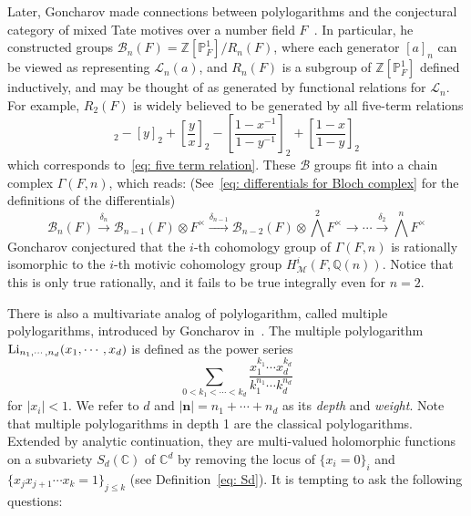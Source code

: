 Later, Goncharov made connections between polylogarithms and the conjectural category of mixed Tate motives over a number field $F$~\cite{GoncharovMotivicGalois}. In particular, he constructed groups $\mathcal B_n(F)=\mathbb Z[\mathbb P^1_F]/R_n(F)$, where each generator $[a]_n$ can be viewed as representing $\mathcal L_n(a)$, and $R_n(F)$ is a subgroup of $\mathbb Z[\mathbb P_F^1]$ defined inductively, and may be thought of as generated by functional relations for $\mathcal L_n$. For example, $R_2(F)$ is widely believed to be generated by all five-term relations
\begin{equation}
[x]_2-[y]_2+\left[\frac{y}{x}\right]_2-\left[\frac{1-x^{-1}}{1-y^{-1}}\right]_2+\left[\frac{1-x}{1-y}\right]_2
\end{equation}
which corresponds to~\eqref{eq: five term relation}. These $\mathcal B$ groups fit into a chain complex $\Gamma(F,n)$, which reads: (See~\eqref{eq: differentials for Bloch complex} for the definitions of the differentials)
\begin{equation}\label{eq: Bloch complex}
\mathcal B_n(F)\xrightarrow{\delta_n}\mathcal B_{n-1}(F)\otimes F^\times\xrightarrow{\delta_{n-1}}\mathcal B_{n-2}(F)\otimes \textstyle\bigwedge^2F^\times\to\cdots\xrightarrow{\delta_2}\textstyle\bigwedge^nF^\times
\end{equation}
Goncharov conjectured that the $i$-th cohomology group of $\Gamma(F,n)$ is rationally isomorphic to the $i$-th motivic cohomology group $H^i_{\mathcal M}(F,\mathbb Q(n))$. Notice that this is only true rationally, and it fails to be true integrally even for $n=2$.

There is also a multivariate analog of polylogarithm, called multiple polylogarithms, introduced by Goncharov in~\cite{Goncharov_GaloisSymmetriesOfFundamentalGroupoidsAndNoncommutativeGeometry}. The multiple polylogarithm $\operatorname{Li}_{n_1,\cdots,n_d}(x_1,\cdots,x_d)$ is defined as the power series
\[
\sum_{0<k_1<\cdots<k_d}\frac{x_1^{k_1}\cdots x_d^{k_d}}{k_1^{n_1}\cdots k_d^{n_d}}
\]
for $|x_i|<1$. We refer to $d$ and $|\mathbf n|=n_1+\cdots+n_d$ as its \textit{depth} and \textit{weight}. Note that multiple polylogarithms in depth 1 are the classical polylogarithms. Extended by analytic continuation, they are multi-valued holomorphic functions on a subvariety $S_d(\mathbb C)$ of $\mathbb C^d$ by removing the locus of $\{x_i=0\}_i$ and
$\{x_jx_{j+1}\cdots x_k=1\}_{j\leq k}$ (see Definition~\ref{eq: Sd}). It is tempting to ask the following questions:

